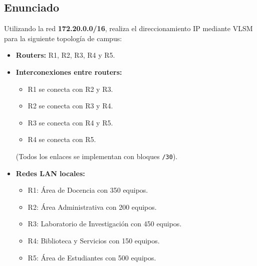 \documentclass[a4paper,12pt]{article}
\begin{document}
\subsection{Enunciado}
Utilizando la red \textbf{172.20.0.0/16}, realiza el direccionamiento IP mediante VLSM para la siguiente topología de campus:
\begin{itemize}
  \item \textbf{Routers:} R1, R2, R3, R4 y R5.
  \item \textbf{Interconexiones entre routers:}
    \begin{itemize}
      \item R1 se conecta con R2 y R3.
      \item R2 se conecta con R3 y R4.
      \item R3 se conecta con R4 y R5.
      \item R4 se conecta con R5.
    \end{itemize}
    (Todos los enlaces se implementan con bloques \texttt{/30}).
  \item \textbf{Redes LAN locales:}
    \begin{itemize}
      \item R1: Área de Docencia con 350 equipos.
      \item R2: Área Administrativa con 200 equipos.
      \item R3: Laboratorio de Investigación con 450 equipos.
      \item R4: Biblioteca y Servicios con 150 equipos.
      \item R5: Área de Estudiantes con 500 equipos.
    \end{itemize}
\end{itemize}
\end{document}
